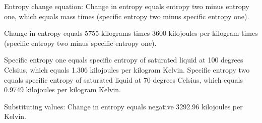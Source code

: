 Entropy change equation:  
Change in entropy equals entropy two minus entropy one, which equals mass times (specific entropy two minus specific entropy one).  

Change in entropy equals 5755 kilograms times 3600 kilojoules per kilogram times (specific entropy two minus specific entropy one).  

Specific entropy one equals specific entropy of saturated liquid at 100 degrees Celsius, which equals 1.306 kilojoules per kilogram Kelvin.  
Specific entropy two equals specific entropy of saturated liquid at 70 degrees Celsius, which equals 0.9749 kilojoules per kilogram Kelvin.  

Substituting values:  
Change in entropy equals negative 3292.96 kilojoules per Kelvin.